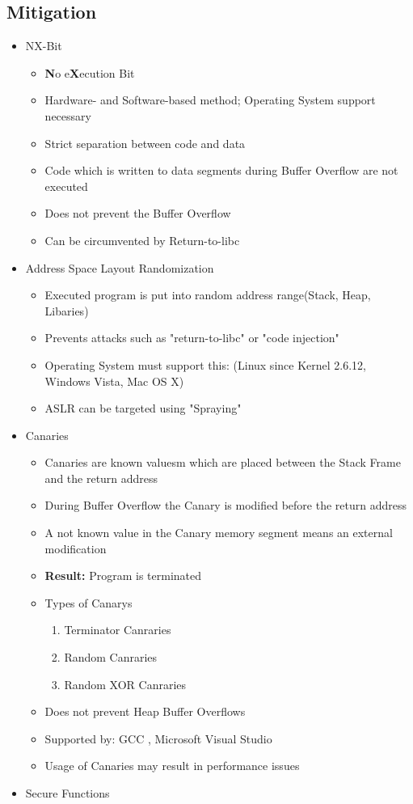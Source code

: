 \documentclass[a4paper, 12pt]{article}
\begin{document}
\subsection{Mitigation}
\begin{itemize}
\item NX-Bit
\begin{itemize}
\item \textbf{N}o e\textbf{X}ecution Bit 
\item Hardware- and Software-based method; Operating System support necessary
\item Strict separation between code and data
\item Code which is written to data segments during Buffer Overflow are not executed
\item Does not prevent the Buffer Overflow
\item Can be circumvented by Return-to-libc
\end{itemize}
\item Address Space Layout Randomization
\begin{itemize}
\item Executed program is put into random address range(Stack, Heap, Libaries)
\item Prevents attacks such as "return-to-libc" or "code injection"
\item Operating System must support this: (Linux since Kernel 2.6.12, Windows Vista, Mac OS X)
\item ASLR can be targeted using "Spraying"
\end{itemize}
\item Canaries
\begin{itemize}
\item Canaries are known valuesm which are placed between the Stack Frame and the return address
\item During Buffer Overflow the Canary is modified before the return address 
\item A not known value in the Canary memory segment means an external modification
\item \textbf{Result:} Program is terminated
\item Types of Canarys
\begin{enumerate}
\item Terminator Canraries
\item Random Canraries
\item Random XOR Canraries
\end{enumerate}
\item Does not prevent Heap Buffer Overflows
\item Supported by: GCC , Microsoft Visual Studio
\item Usage of Canaries may result in performance issues
\end{itemize}
\item Secure Functions
\end{itemize}
\end{document}
